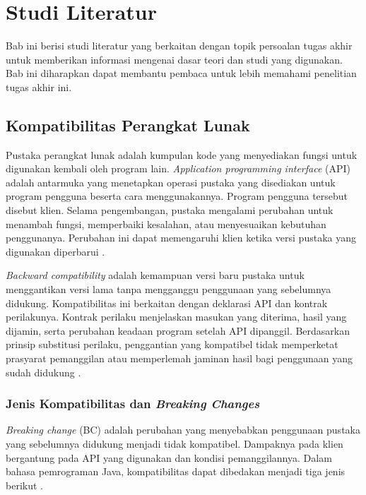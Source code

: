 
\chapter{Studi Literatur}
\label{chap:studi-literatur}

Bab ini berisi studi literatur yang berkaitan dengan topik persoalan tugas akhir untuk memberikan informasi mengenai dasar teori dan studi yang digunakan. Bab ini diharapkan dapat membantu pembaca untuk lebih memahami penelitian tugas akhir ini.

\section{Kompatibilitas Perangkat Lunak}
\label{sec:kompatibilitas}

Pustaka perangkat lunak adalah kumpulan kode yang menyediakan fungsi untuk digunakan kembali oleh program lain\@. \textit{Application programming interface} (API) adalah antarmuka yang menetapkan operasi pustaka yang disediakan untuk program pengguna beserta cara menggunakannya. Program pengguna tersebut disebut klien. Selama pengembangan, pustaka mengalami perubahan untuk menambah fungsi, memperbaiki kesalahan, atau menyesuaikan kebutuhan penggunanya. Perubahan ini dapat memengaruhi klien ketika versi pustaka yang digunakan diperbarui \parencite{Ochoa2023}.

\textit{Backward compatibility} adalah kemampuan versi baru pustaka untuk menggantikan versi lama tanpa mengganggu penggunaan yang sebelumnya didukung. Kompatibilitas ini berkaitan dengan deklarasi API dan kontrak perilakunya. Kontrak perilaku menjelaskan masukan yang diterima, hasil yang dijamin, serta perubahan keadaan program setelah API dipanggil. Berdasarkan prinsip substitusi perilaku, penggantian yang kompatibel tidak memperketat prasyarat pemanggilan atau memperlemah jaminan hasil bagi penggunaan yang sudah didukung \parencite{LiskovWing1994,Ochoa2023}.

\subsection{Jenis Kompatibilitas dan \textit{Breaking Changes}}

\textit{Breaking change} (BC) adalah perubahan yang menyebabkan penggunaan pustaka yang sebelumnya didukung menjadi tidak kompatibel. Dampaknya pada klien bergantung pada API yang digunakan dan kondisi pemanggilannya. Dalam bahasa pemrograman Java, kompatibilitas dapat dibedakan menjadi tiga jenis berikut \parencite{Ochoa2023,JLS25Chapter13}.

